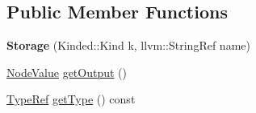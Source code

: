 \subsection*{Public Member Functions}
\begin{DoxyCompactItemize}
\item 
\mbox{\label{classglow_1_1_storage_a9cd49344209da553251799a0c4ecee1d}} 
{\bfseries Storage} (Kinded\+::\+Kind k, llvm\+::\+String\+Ref name)
\item 
\hyperlink{structglow_1_1_node_value}{Node\+Value} \hyperlink{classglow_1_1_storage_a76b8f66f05094e222fc5416688fd9014}{get\+Output} ()
\item 
\hyperlink{structglow_1_1_type}{Type\+Ref} \hyperlink{classglow_1_1_storage_a7dd9963b09942c7e1772125112be7e3f}{get\+Type} () const
\end{DoxyCompactItemize}
\textbf{ }\par
